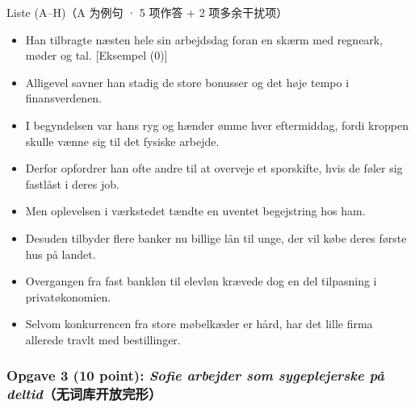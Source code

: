 \begin{grammatikbox}{Liste (A--H)（A 为例句 · 5 项作答 + 2 项多余干扰项）}
\small
\begin{itemize}[leftmargin=2.2em, itemsep=0.35em]
  \item[\textbf{\color{NCDGray}A.}] \textcolor{NCDGray}{Han tilbragte næsten hele sin arbejdsdag foran en skærm med regneark, møder og tal.} {\footnotesize\color{NCDRed}[Eksempel (0)]}
  \item[\textbf{B.}] Alligevel savner han stadig de store bonusser og det høje tempo i finansverdenen.
  \item[\textbf{C.}] I begyndelsen var hans ryg og hænder ømme hver eftermiddag, fordi kroppen skulle vænne sig til det fysiske arbejde.
  \item[\textbf{D.}] Derfor opfordrer han ofte andre til at overveje et sporskifte, hvis de føler sig fastlåst i deres job.
  \item[\textbf{E.}] Men oplevelsen i værkstedet tændte en uventet begejstring hos ham.
  \item[\textbf{F.}] Desuden tilbyder flere banker nu billige lån til unge, der vil købe deres første hus på landet.
  \item[\textbf{G.}] Overgangen fra fast bankløn til elevløn krævede dog en del tilpasning i privatøkonomien.
  \item[\textbf{H.}] Selvom konkurrencen fra store møbelkæder er hård, har det lille firma allerede travlt med bestillinger.
\end{itemize}
\end{grammatikbox}

\subsubsection*{Opgave 3 (10 point): \textit{Sofie arbejder som sygeplejerske på deltid}（无词库开放完形）}

